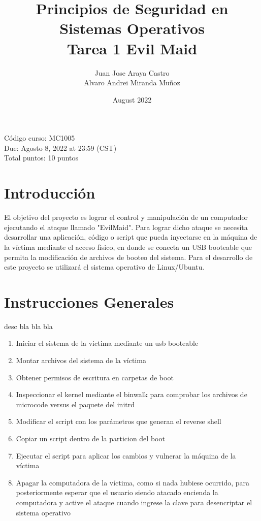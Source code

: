 \documentclass{article}
\title{Principios de Seguridad en Sistemas Operativos \\ Tarea 1 Evil Maid}
\author{Juan Jose Araya Castro \\
Alvaro Andrei Miranda Muñoz}
\date{August 2022}
\begin{document}
\maketitle

\begin{minipage}{\textwidth}
Código curso: MC1005\\
Due: Agosto 8, 2022 at 23:59 (CST)\\
Total puntos: 10 puntos\\
\end{minipage}
    
\section*{Introducción}
El objetivo del proyecto es lograr el control y manipulación de un computador ejecutando el ataque llamado "EvilMaid". Para lograr dicho ataque se necesita desarrollar una aplicación, código o script que pueda inyectarse en la máquina de la víctima mediante el acceso físico, en donde se conecta un USB booteable que permita la modificación de archivos de booteo del sistema. Para el desarrollo de este proyecto se utilizará el sistema operativo de Linux/Ubuntu.

\section*{Instrucciones Generales}

desc bla bla bla 

\begin{enumerate}
  \item Iniciar el sistema de la victima mediante un usb booteable
  
  \item Montar archivos del sistema de la víctima
  
  \item Obtener permisos de escritura en carpetas de boot
  
  \item Inspeccionar el kernel mediante el binwalk para comprobar los archivos de microcode versus el paquete del initrd
  
  \item Modificar el script con los parámetros que generan el reverse shell
  
  \item Copiar un script dentro de la particion del boot
  
  \item Ejecutar el script para aplicar los cambios y vulnerar la máquina de la víctima
  
  \item Apagar la computadora de la víctima, como si nada hubiese ocurrido, para posteriormente esperar que el usuario siendo atacado encienda la computadora y active el ataque cuando ingrese la clave para desencriptar el sistema operativo
  
\end{enumerate}
\end{document}
